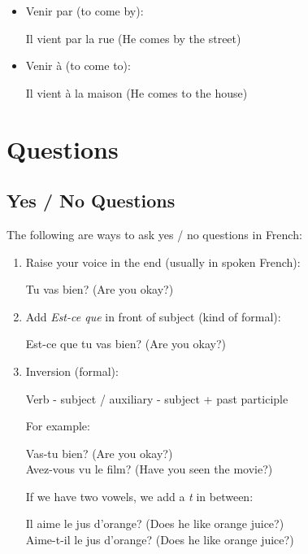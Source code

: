 \documentclass{book}
\begin{document}
\begin{itemize}
\begin{itemize}
                    \item Venir par (to come by):
                        \begin{center}
                            Il vient par la rue (He comes by the street)
                        \end{center}

                    \item Venir à (to come to):
                        \begin{center}
                            Il vient à la maison (He comes to the house)
                        \end{center}
                \end{itemize}
        \end{itemize}

\chapter{Questions}
    \section{Yes / No Questions}
    The following are ways to ask yes / no questions in French:
        \begin{enumerate}
            \item Raise your voice in the end (usually in spoken French):
                \begin{center}
                    Tu vas bien? (Are you okay?)
                \end{center}

            \item Add \textit{Est-ce que} in front of subject (kind of formal):
                \begin{center}
                    Est-ce que tu vas bien? (Are you okay?)
                \end{center}

            \item Inversion (formal):
                \begin{center}
                    Verb - subject / auxiliary - subject + past participle \\
                \end{center}
                For example:
                \begin{center}
                    Vas-tu bien? (Are you okay?) \\
                    Avez-vous vu le film? (Have you seen the movie?)
                \end{center}
                If we have two vowels, we add a \textit{t} in between:
                \begin{center}
                    Il aime le jus d'orange? (Does he like orange juice?) \\
                    Aime-t-il le jus d'orange? (Does he like orange juice?)
                \end{center}
        \end{enumerate}
    
\end{document}
